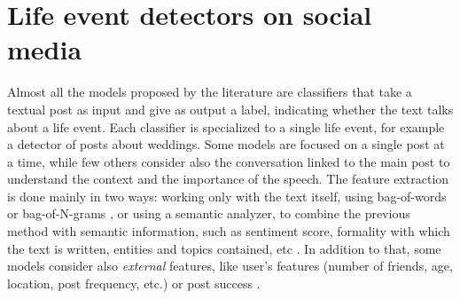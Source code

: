 \section{Life event detectors on social media}
\label{sec:socialmediadetectors}
Almost all the models proposed by the literature are classifiers that take a textual post as input and give as output a label, indicating whether the text talks about a life event. Each classifier is specialized to a single life event, for example a detector of posts about weddings. Some models are focused on a single post at a time, while few others \cite{cavalin2015multiple, moyanolife} consider also the conversation linked to the main post to understand the context and the importance of the speech. The feature extraction is done mainly in two ways: working only with the text itself, using bag-of-words or bag-of-N-grams \cite{cavalinclassification, di2013detecting, li2014major}, or using a semantic analyzer, to combine the previous method with semantic information, such as sentiment score, formality with which the text is written, entities and topics contained, etc \cite{khobarekar2013detecting}. In addition to that, some models consider also \emph{external} features, like user's features (number of friends, age, location, post frequency, etc.) or post success \cite{dickinson2015identifying}.

